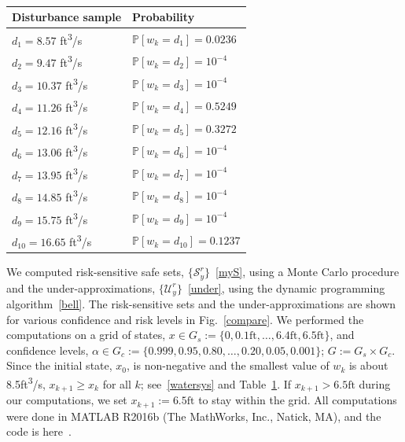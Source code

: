 \documentclass[letterpaper, 10 pt, conference]{ieeeconf}  %
\begin{document}
\begin{table}
\begin{center}
\caption{}
\begin{tabular}{| p{3cm} | p{3cm} |}
\hline
\bf{Disturbance sample} & \bf{Probability} \\ \hline
$d_1 = 8.57$ ft\textsuperscript{3}/s & $\mathbb{P}[w_k = d_1] = 0.0236$ \\ \hline
$d_2 = 9.47$ ft\textsuperscript{3}/s & $\mathbb{P}[w_k = d_2] = 10^{-4}$ \\ \hline
$d_3 = 10.37$ ft\textsuperscript{3}/s & $\mathbb{P}[w_k = d_3] = 10^{-4}$ \\ \hline
$d_4 = 11.26$ ft\textsuperscript{3}/s & $\mathbb{P}[w_k = d_4] = 0.5249$ \\ \hline
$d_5 = 12.16$ ft\textsuperscript{3}/s & $\mathbb{P}[w_k = d_5] = 0.3272$ \\ \hline
$d_6 = 13.06$ ft\textsuperscript{3}/s & $\mathbb{P}[w_k = d_6] = 10^{-4}$ \\ \hline
$d_7 = 13.95$ ft\textsuperscript{3}/s & $\mathbb{P}[w_k = d_7] = 10^{-4}$ \\ \hline
$d_8 = 14.85$ ft\textsuperscript{3}/s & $\mathbb{P}[w_k = d_8] = 10^{-4}$ \\ \hline
$d_9 = 15.75$ ft\textsuperscript{3}/s & $\mathbb{P}[w_k = d_9] = 10^{-4}$ \\ \hline
$d_{10} = 16.65$ ft\textsuperscript{3}/s & $\mathbb{P}[w_k = d_{10}] = 0.1237$ \\ \hline
\end{tabular}
\begin{flushleft} \end{flushleft}
\label{dist}
\end{center}
\end{table}

We computed risk-sensitive safe sets, $\{\mathcal{S}_y^r\}$~\eqref{myS}, using a Monte Carlo procedure 
and the under-approximations, $\{\mathcal{U}_y^r\}$~\eqref{under}, using the dynamic programming algorithm~\eqref{bell}.
The risk-sensitive sets and the under-approximations are shown for various confidence and risk levels in Fig.~\ref{compare}.
We performed the computations on a grid of states, $x \in G_s := \{0, 0.1\text{ft}, \dots, 6.4\text{ft}, 6.5\text{ft}\}$,
and confidence levels, $\alpha \in G_c := \{0.999, 0.95, 0.80, \dots, 0.20, 0.05, 0.001\}$; $G := G_s \times G_c$.
Since the initial state, $x_0$, is non-negative and the smallest value of $w_k$ is about 8.5ft\textsuperscript{3}/s, 
$x_{k+1}\geq x_k$ for all $k$; see~\eqref{watersys} and Table~\ref{dist}. 
If $x_{k+1} > 6.5\text{ft}$ during our computations, we set $x_{k+1} := 6.5\text{ft}$ to stay within the grid.
All computations were done in MATLAB R2016b (The MathWorks, Inc., Natick, MA), and the code is here~\cite{mycode}.
\end{document}
